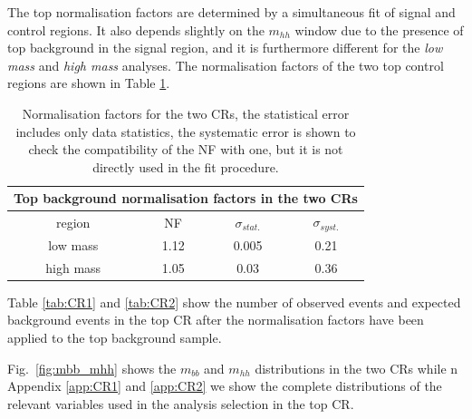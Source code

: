 \begin{table}
\caption{Data and expected background yields in the high mass control
  region. NF of 1.05 has been applied to $t\bar{t}$ background.} \label{tab:CR2}

\end{table}


The top normalisation factors are determined by a simultaneous fit  of
signal and control regions. It also depends slightly on the $m_{hh}$ window due to the presence of top background in the signal region, and it is furthermore different for the \emph{low  mass} and \emph{high mass} analyses. The normalisation
factors of the two top control regions are shown in Table \ref{tab:NFs}.
\begin{table}
\caption{Normalisation factors for the two CRs, the statistical error
  includes only data statistics, the systematic error is shown to
  check the compatibility of the NF with one, but it is not directly
  used in the fit procedure.} \label{tab:NFs}
\begin{center}
\begin{tabular}{c|c|c|c}
\multicolumn{4}{c}{Top background normalisation factors in the two
  CRs} \\
\hline
region & NF & $\sigma_{stat.}$ & $\sigma_{syst.}$ \\
\hline
low mass & 1.12 & 0.005 & 0.21 \\
high mass & 1.05 & 0.03 & 0.36 \\
\hline
\end{tabular}
\end{center}
\end{table}

Table \ref{tab:CR1} and \ref{tab:CR2} show the number of observed
events and expected background events in the top CR after the
normalisation factors have been applied to the top background sample.

Fig.~\ref{fig:mbb_mhh} shows the $m_{bb}$ and $m_{hh}$ distributions in the two CRs while n Appendix \ref{app:CR1} and \ref{app:CR2} we show the complete distributions of the
relevant variables used in the analysis selection in the top CR.  

